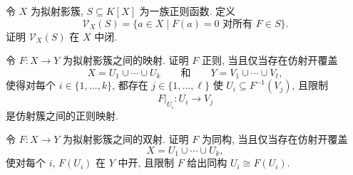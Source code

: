 \begin{BookExercises}
  \item\label{ex:vanishing-locus-of-regular-functions-is-closed} 令 $X$ 为拟射影簇, $S\subseteq K[X]$ 为一族正则函数. 定义
  \[
    \mathcal{V}_{X}(S)=\{a\in X\mid F(a)=0\text{ 对所有 }F\in S\}.
  \]
  证明 $\mathcal{V}_{X}(S)$ 在 $X$ 中闭.
  \item\label{ex:regular-maps-via-affine-open-covers} 令 $F:X\to Y$ 为拟射影簇之间的映射. 证明 $F$ 正则, 当且仅当存在仿射开覆盖
  \[
    X=U_{1}\cup\cdots\cup U_{k}\qquad\text{和}\qquad
    Y=V_{1}\cup\cdots\cup V_{\ell},
  \]
  使得对每个 $i\in\{1,\ldots,k\}$, 都存在 $j\in\{1,\ldots,\ell\}$ 使 $U_{i}\subseteq F^{-1}(V_{j})$, 且限制
  \[
    F|_{U_{i}}:U_{i}\to V_{j}
  \]
  是仿射簇之间的正则映射.
  \item\label{ex:quasiprojective-isomorphisms-via-affine-open-cover} 令 $F:X\to Y$ 为拟射影簇之间的双射. 证明 $F$ 为同构, 当且仅当存在仿射开覆盖
  \[
    X=U_{1}\cup\cdots\cup U_{k},
  \]
  使对每个 $i$, $F(U_{i})$ 在 $Y$ 中开, 且限制 $F$ 给出同构 $U_{i}\cong F(U_{i})$.
\end{BookExercises}
